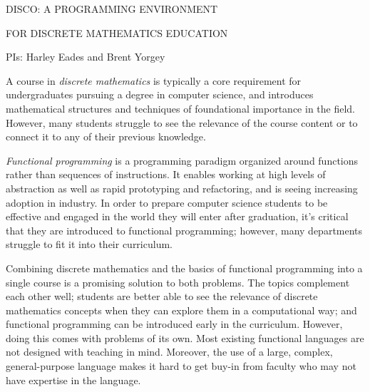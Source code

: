 \centerline{\Large DISCO: A PROGRAMMING ENVIRONMENT}
\vspace{1ex}
\centerline{\Large FOR DISCRETE MATHEMATICS EDUCATION}
\vspace{3ex}
\centerline{\large PIs: Harley Eades and Brent Yorgey}
\vspace{3ex}

\begin{comment}
  The proposal must contain a summary of the proposed activity suitable
  for publication, not more than one page in length. It should not be an
  abstract of the proposal, but rather a self-contained description of the
  activity that would result if the proposal were funded. The summary
  should be written in the third person and include a statement of
  objectives and methods to be employed. It must clearly address in
  separate statements (within the one-page summary): (1) the intellectual
  merit of the proposed activity; and (2) the broader impacts resulting
  from the proposed activity. (See Chapter III for further descriptive
  information on the NSF merit review criteria.) It should be informative
  to other persons working in the same or related fields and, insofar as
  possible, understandable to a scientifically or technically literate lay
  reader. Proposals that do not separately address both merit review
  criteria within the one page Project Summary will be returned without
  review.
\end{comment}

A course in \emph{discrete mathematics} is typically a core
requirement for undergraduates pursuing a degree in computer science,
and introduces mathematical structures and techniques of foundational
importance in the field.  However, many students struggle to see the
relevance of the course content or to connect it to any of their
previous knowledge.

\emph{Functional programming} is a programming paradigm organized
around functions rather than sequences of instructions.  It enables
working at high levels of abstraction as well as rapid prototyping and
refactoring, and is seeing increasing adoption in industry.  In order
to prepare computer science students to be effective and engaged in
the world they will enter after graduation, it's critical that they
are introduced to functional programming; however, many departments
struggle to fit it into their curriculum.

Combining discrete mathematics and the basics of functional
programming into a single course is a promising solution to both
problems.  The topics complement each other well; students are better
able to see the relevance of discrete mathematics concepts when they
can explore them in a computational way; and functional programming
can be introduced early in the curriculum.  However, doing this comes
with problems of its own. Most existing functional languages are not
designed with teaching in mind. Moreover, the use of a large, complex,
general-purpose language makes it hard to get buy-in from faculty who
may not have expertise in the language.

